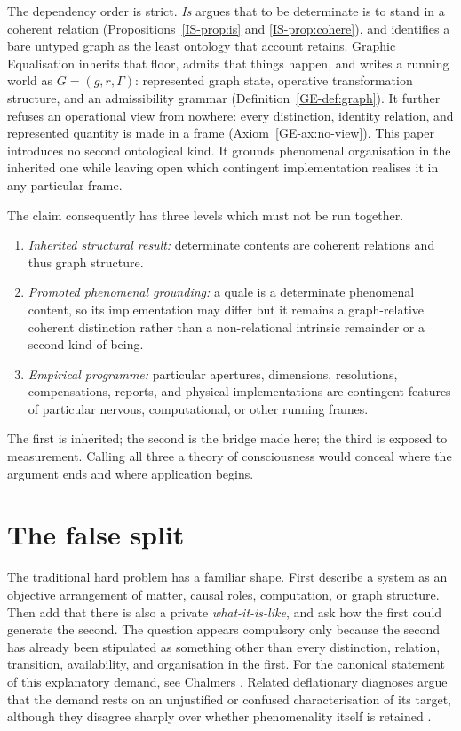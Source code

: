 \documentclass[11pt,a4paper]{article}
\theoremstyle{remark}\newtheorem{remark}[definition]{Remark}
\begin{document}
The dependency order is strict. \emph{Is} argues that to be determinate is to
stand in a coherent relation (Propositions~\ref{IS-prop:is} and
\ref{IS-prop:cohere}), and identifies a bare untyped graph as the least ontology
that account retains. Graphic Equalisation inherits that floor, admits that things
happen, and writes a running world as $G=(g,r,\Gamma)$: represented graph state,
operative transformation structure, and an admissibility grammar
(Definition~\ref{GE-def:graph}). It further refuses an operational view from
nowhere: every distinction, identity relation, and represented quantity is made in
a frame (Axiom~\ref{GE-ax:no-view}). This paper introduces no second ontological
kind. It grounds phenomenal organisation in the inherited one while leaving open
which contingent implementation realises it in any particular frame.

The claim consequently has three levels which must not be run together.
\begin{enumerate}[leftmargin=*]
\item \emph{Inherited structural result:} determinate contents are coherent
relations and thus graph structure.
\item \emph{Promoted phenomenal grounding:} a quale is a determinate phenomenal
content, so its implementation may differ but it remains a graph-relative coherent
distinction rather than a non-relational intrinsic remainder or a second kind of
being.
\item \emph{Empirical programme:} particular apertures, dimensions, resolutions,
compensations, reports, and physical implementations are contingent features of
particular nervous, computational, or other running frames.
\end{enumerate}

The first is inherited; the second is the bridge made here; the third is exposed
to measurement. Calling all three a theory of consciousness would conceal where
the argument ends and where application begins.

\section{The false split}\label{sec:false-split}

The traditional hard problem has a familiar shape. First describe a system as an
objective arrangement of matter, causal roles, computation, or graph structure.
Then add that there is also a private \emph{what-it-is-like}, and ask how the first
could generate the second. The question appears compulsory only because the second
has already been stipulated as something other than every distinction, relation,
transition, availability, and organisation in the first. For the canonical statement
of this explanatory demand, see Chalmers \cite{chalmers1995}. Related
deflationary diagnoses argue that the demand rests on an unjustified or confused
characterisation of its target, although they disagree sharply over whether
phenomenality itself is retained \cite{churchland1996,carruthersschier2017,dennett2018}.
\end{document}

